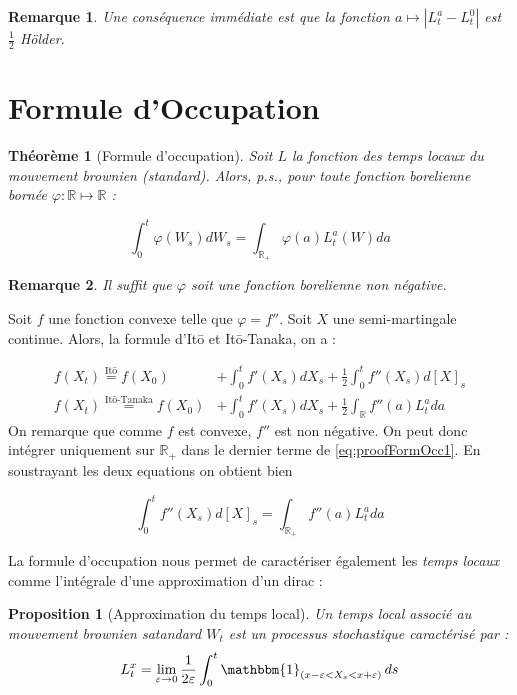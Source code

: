 \documentclass[openany]{book}
\makeatletter
\newcommand{\R}{\mathbb{R}}
\newcommand{\1}{\mathbbm{1}}
\renewenvironment{proof}[1][\textbf{\textit{Démonstration}}]{%
  \par\pushQED{\qed}%
  \normalfont\topsep6\p@\@plus6\p@\relax
  \trivlist\item[\hskip\labelsep
    #1\@addpunct{.}]\ignorespaces
}{%
  \popQED\endtrivlist\@endpefalse
}
\theoremstyle{thmfont}
\newtheorem{theorem}{Théorème}[chapter]
\theoremstyle{deffont}
\theoremstyle{thmfont}
\newtheorem{prop}[prop]{Proposition}
\theoremstyle{deffont}
\newtheorem*{remark}{Remarque}
\makeatother
\begin{document}
\begin{remark}
  Une conséquence immédiate est que la fonction $a \mapsto |L_t^a - L_t^0|$ est $\frac{1}{2}$ Hölder. 
\end{remark}

\section{Formule d'Occupation}

\begin{theorem}[Formule d'occupation]
\label{thm:occupation} Soit $L$ la fonction des temps locaux du mouvement brownien (standard). Alors, p.s., pour toute fonction borelienne bornée $\varphi : \R \mapsto \R$ :

\begin{equation}
  \int_0^t \varphi(W_s) dW_s = \int_{\R_+}\varphi(a)L_t^a(W)da
\end{equation}

\end{theorem}

\begin{remark}
  Il suffit que $\varphi$ soit une fonction borelienne non négative.
  \end{remark}

{\color{red}\begin{proof}
    Soit $f$ une fonction convexe telle que $\varphi = f''$. Soit $X$ une semi-martingale continue. Alors, la formule d'Itō et Itō-Tanaka, on a :

    \begin{align}
      f(X_t) \overset{\text{Itō}}{=} f(X_0) &+ \int_0^t f'(X_s) dX_s + \frac{1}{2} \int_0^t f''(X_s) d[X]_s \label{eq:proofFormOcc1}\\
      f(X_t) \overset{\text{Itō-Tanaka}}{=} f(X_0) &+ \int_0^t f'(X_s) dX_s + \frac{1}{2}\int_\R f''(a) L_t^a da  \label{eq:proofFormOcc1}
    \end{align}
    On remarque que comme $f$ est convexe, $f''$ est non négative. On peut donc intégrer uniquement sur $\R_+$ dans le dernier terme de \eqref{eq:proofFormOcc1}.
    En soustrayant les deux equations on obtient bien

    $$\int_0^t f''(X_s) d[X]_s = \int_{\R_+} f''(a) L_t^a da$$
  \end{proof}}

La formule d'occupation nous permet de caractériser également les \textit{temps locaux} comme l'intégrale d'une approximation d'un dirac :

\begin{prop}[Approximation du temps local]
  \label{prop:caractTempsLoc}
  Un \textit{temps local} associé au mouvement brownien satandard $W_t$ est un processus stochastique caractérisé par :
\begin{equation*}
  L_t^x = \lim_{\varepsilon \to 0} \frac{1}{2\varepsilon} \int_0^t \1_{(x - \varepsilon < X_s < x + \varepsilon)} \, ds
\end{equation*}
\end{prop}
\end{document}
